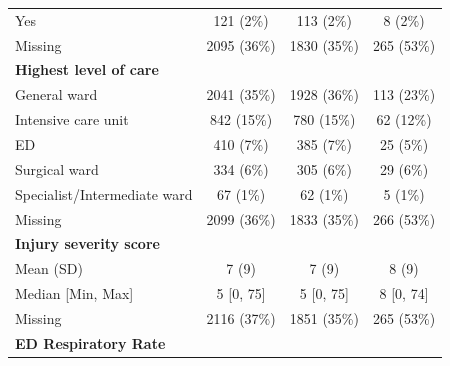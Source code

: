 \documentclass[12pt, a4paper]{article}
\begin{document}
\begin{appendices}
\begin{table}[t!]
{\begin{tabular}{lccc}
                \hspace{3mm}Yes                               & 121 (2\%)         & 113 (2\%)         & 8 (2\%)          \\
                \hspace{3mm}Missing                           & 2095 (36\%)       & 1830 (35\%)       & 265 (53\%)       \\
                \textbf{Highest level of care}                &                   &                   &                  \\
                \hspace{3mm}General ward                      & 2041 (35\%)       & 1928 (36\%)       & 113 (23\%)       \\
                \hspace{3mm}Intensive care unit               & 842 (15\%)        & 780 (15\%)        & 62 (12\%)        \\
                \hspace{3mm}ED                                & 410 (7\%)         & 385 (7\%)         & 25 (5\%)         \\
                \hspace{3mm}Surgical ward                     & 334 (6\%)         & 305 (6\%)         & 29 (6\%)         \\
                \hspace{3mm}Specialist/Intermediate ward      & 67 (1\%)          & 62 (1\%)          & 5 (1\%)          \\
                \hspace{3mm}Missing                           & 2099 (36\%)       & 1833 (35\%)       & 266 (53\%)       \\
                \textbf{Injury severity score}                &                   &                   &                  \\
                \hspace{3mm}Mean (SD)                         & 7 (9)             & 7 (9)             & 8 (9)            \\
                \hspace{3mm}Median [Min, Max]                 & 5 [0, 75]         & 5 [0, 75]         & 8 [0, 74]        \\
                \hspace{3mm}Missing                           & 2116 (37\%)       & 1851 (35\%)       & 265 (53\%)       \\
                \textbf{ED Respiratory Rate}                  &                   &                   &                  \\

\end{tabular}}
\end{table}
\end{appendices}
\end{document}
